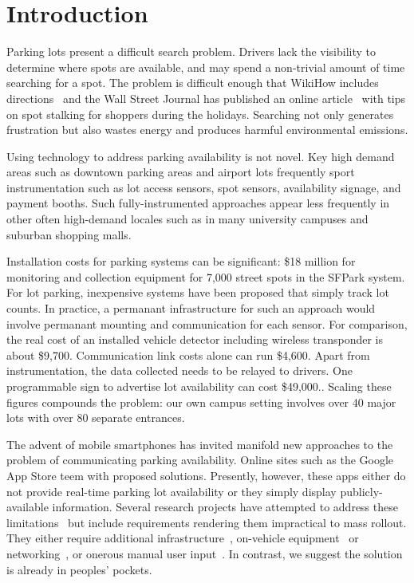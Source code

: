 \section{Introduction}


Parking lots present a difficult search problem. Drivers lack the visibility
to determine where spots are available, and may spend a non-trivial amount of
time searching for a spot. The problem is difficult enough that WikiHow
includes directions~\cite{wikihow-park} and the Wall Street Journal has
published an online article~\cite{wsj-park} with tips on spot stalking for
shoppers during the holidays. Searching not only generates frustration but
also wastes energy and produces harmful environmental emissions.

Using technology to address parking availability is not novel.  Key high
demand areas such as downtown parking areas and airport lots frequently sport
instrumentation such as lot access sensors, spot sensors, availability
signage, and payment booths.  Such fully-instrumented approaches appear less
frequently in other often high-demand locales such as in many university
campuses and suburban shopping malls.

Installation costs for parking systems can be significant:  \$18 million for
monitoring and collection equipment for 7,000 street spots in the SFPark
system.\cite{sf-park}  For lot parking, inexpensive systems have been
proposed that simply track lot counts.\cite{lot-count}  In practice, a
permanant infrastructure for such an approach would involve permanant
mounting and communication for each sensor.  For comparison, the real cost
of an installed vehicle detector including wireless transponder is about
\$9,700.\cite{car-detect}  Communication link costs alone can run
\$4,600.\cite{mstp-park}  Apart from instrumentation, the data collected
needs to be relayed to drivers.  One programmable sign to advertise lot
availability can cost \$49,000.\cite{mstp-park}.  Scaling these figures
compounds the problem:  our own campus setting involves over 40 major lots
with over 80 separate entrances.

The advent of mobile smartphones has invited manifold new approaches to the
problem of communicating parking availability.  Online sites such as the
Google App Store teem with proposed solutions.  Presently, however, these
apps either do not provide real-time parking lot availability or they simply
display publicly-available information. Several research projects have
attempted to address these limitations~\cite{4212497, Chen:2012:COS,
Delot:2009:CRP, 5062057, Mathur:2010:PDS} but include requirements rendering
them impractical to mass rollout.  They either require additional
infrastructure~\cite{5062057}, on-vehicle equipment~\cite{Mathur:2010:PDS}
or networking~\cite{Delot:2009:CRP, Mathur:2010:PDS}, or onerous manual user
input~\cite{Chen:2012:COS}. In contrast, we suggest the solution is already
in peoples' pockets.

